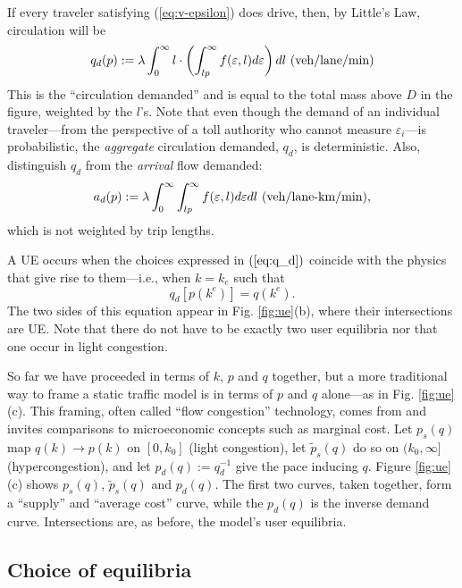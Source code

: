 \documentclass[preprint,authoryear]{elsarticle}
\newcommand{\ve}{\varepsilon}
\begin{document}
If every traveler satisfying (\ref{eq:v-epsilon}) does drive, then, by Little's Law, circulation will be
\begin{equation}\label{eq:q_d}
		q_d(p) := \lambda \int_{0}^{\infty} l \cdot \left( \int_{lp}^{\infty} f(\ve,l) d\ve \right) dl \,\, \textnormal{(veh/lane/min)}
\end{equation}
This is the ``circulation demanded'' and is equal to the total mass above $D$ in the figure, weighted by the $l$'s. Note that even though the demand of an individual traveler---from the perspective of a toll authority who cannot measure $\varepsilon_i$---is probabilistic, the \emph{aggregate} circulation demanded, $q_d$, is deterministic. Also, distinguish $q_d$ from the \emph{arrival} flow demanded:
\begin{equation}\label{eq:a_d}
	a_d(p) := \lambda \int_{0}^{\infty} \int_{lp}^{\infty} f(\ve,l)d\ve dl \,\, \textnormal{(veh/lane-km/min)},
\end{equation}
which is not weighted by trip lengths.

A UE occurs when the choices expressed in $(\ref{eq:q_d})$ coincide with the physics that give rise to them---i.e., when $k=k_e$ such that
\begin{equation}\label{eq:equilibrium-n}
	q_d[p(k^e)] = q(k^e).
\end{equation}
The two sides of this equation appear in Fig. \ref{fig:ue}(b), where their intersections are UE. Note that there do not have to be exactly two user equilibria nor that one occur in light congestion.

So far we have proceeded in terms of $k$, $p$ and $q$ together, but a more traditional way to frame a static traffic model is in terms of $p$ and $q$ alone---as in Fig. \ref{fig:ue}(c). This framing, often called ``flow congestion'' technology, comes from \citet{Walters1961} and invites comparisons to microeconomic concepts such as marginal cost. Let $p_s(q)$ map $q(k)\rightarrow p(k)$ on $[0,k_0]$ (light congestion), let $\tilde{p}_s(q)$ do so on $(k_0,\infty]$ (hypercongestion), and let $p_d(q):=q_d^{-1}$ give the pace inducing $q$. Figure \ref{fig:ue}(c) shows $p_s(q)$, $\tilde{p}_s(q)$ and $p_d(q)$. The first two curves, taken together, form a ``supply'' and ``average cost'' curve, while the $p_d(q)$ is the inverse demand curve. Intersections are, as before, the model's user equilibria. 

\subsection{Choice of equilibria}
\label{ssec:choice_of_equilibria}
\end{document}

